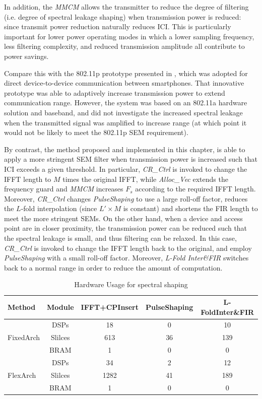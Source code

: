In addition, the \emph{MMCM} allows the transmitter to reduce the degree of filtering (i.e. degree of spectral leakage shaping) when transmission power is reduced: since transmit power reduction naturally reduces ICI.
This is particularly important for lower power operating modes in which a lower sampling frequency, less filtering complexity, and reduced transmission amplitude all contribute to power savings.

Compare this with the 802.11p prototype presented in \cite{Choi2014}, which was adopted for direct device-to-device communication between smartphones.
That innovative prototype was able to adaptively increase transmission power to extend communication range.
However, the system was based on an 802.11a hardware solution and baseband, and did not investigate the increased spectral leakage when the transmitted signal was amplified to increase range (at which point it would not be likely to meet the 802.11p SEM requirement).

By contrast, the method proposed and implemented in this chapter, is able to apply a more stringent SEM filter when transmission power is increased such that ICI exceeds a given threshold.
In particular, \emph{CR\_Ctrl} is invoked to change the IFFT length to $M$ times the original IFFT, while \emph{Alloc\_Vec} extends the frequency guard and \emph{MMCM} increases $\mathit{F_s}$ according to the required IFFT length.
Moreover, \emph{CR\_Ctrl} changes \emph{PulseShaping} to use a large roll-off factor, reduces the $L$-fold interpolation (since $L'\times M$ is constant) and shortens the FIR length to meet the more stringent SEMs.
On the other hand, when a device and access point are in closer proximity, the transmission power can be reduced such that the spectral leakage is small, and thus filtering can be relaxed.
In this case, \emph{CR\_Ctrl} is invoked to change the IFFT length back to the original, and employ \emph{PulseShaping} with a small roll-off factor. Moreover, \emph{L-Fold Inter\&FIR} switches back to a normal range in order to reduce the amount of computation.

\begin{table}
	\centering
	\caption{Hardware Usage for spectral shaping}
	\label{tab:HardwareUsage}
	\renewcommand{\arraystretch}{1.5}
	\begin{tabular}{lcccc}
		\toprule
		Method		& Module	& IFFT+CPInsert  & PulseShaping  & L-FoldInter\&FIR \\
		\midrule
		& DSPs		& 18	& 0		& 10	\\
		FixedArch		& Slilces	& 613	& 36	& 139	\\
		& BRAM		& 1	 	& 0		& 0 	\\
		\midrule
		& DSPs		& 34	& 2		& 12	\\
		FlexArch		& Slilces	& 1282	& 41	& 189	\\
		& BRAM		& 1	 	& 0		& 0 	\\

		\bottomrule
	\end{tabular}
\end{table}

